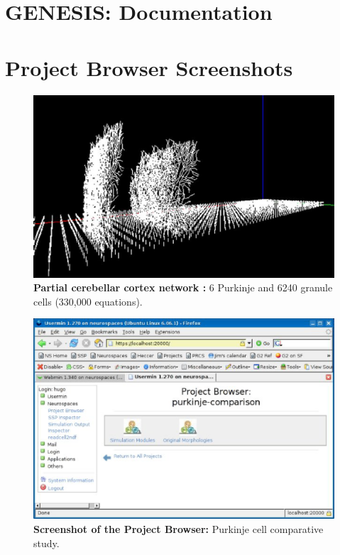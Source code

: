\documentclass[12pt]{article}
\begin{document}
\section*{GENESIS: Documentation}

\section*{Project Browser Screenshots}

\begin{figure}[h]
  \centering
 \includegraphics[scale=0.5]{figures/screenshot-1.eps}
\caption{{\bf Partial cerebellar cortex network :} 6 Purkinje and 6240 granule cells (330,000 equations).}
  \label{fig:pb-1}
\end{figure}


\begin{figure}[h]
  \centering
 \includegraphics[scale=0.6]{figures/screenshot-3.eps}
 \caption{{\bf Screenshot of the Project Browser:} Purkinje cell comparative study.}
  \label{fig:pb-3}
\end{figure}
\end{document}
